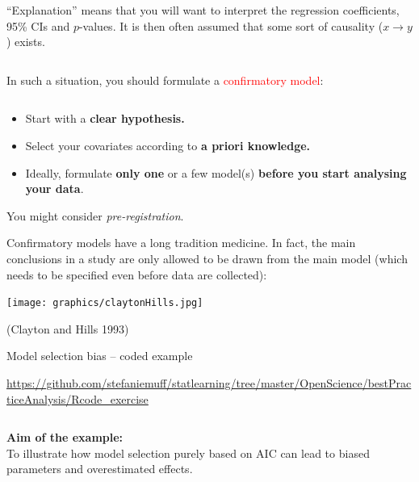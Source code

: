 \documentclass[
  10pt,
  ignorenonframetext,
]{beamer}
\begin{document}
\begin{frame}
\(~\)

``Explanation'' means that you will want to interpret the regression
coefficients, 95\% CIs and \(p\)-values. It is then often assumed that
some sort of causality (\(x\rightarrow y\)) exists.

\(~\)

In such a situation, you should formulate a
\textcolor{red}{confirmatory model}:

\(~\)

\begin{tcolorbox}
\begin{itemize}
\item Start with a {\bf clear hypothesis.}

\vspace{2mm}

\item Select your covariates according to {\bf a priori knowledge.}

\vspace{2mm}

\item Ideally, formulate {\bf only one} or a few model(s) {\bf before you start analysing your data}.
\end{itemize}

\end{tcolorbox}

\vspace{8mm}

You might consider \emph{pre-registration}.
\end{frame}

\begin{frame}
Confirmatory models have a long tradition medicine. In fact, the main
conclusions in a study are only allowed to be drawn from the main model
(which needs to be specified even before data are collected):

\vspace{2mm}

\texttt{[image: graphics/claytonHills.jpg]}
\(~\)

\scriptsize (Clayton and Hills 1993)
\end{frame}

\begin{frame}
\begin{block}{Model selection bias -- coded example}
\protect\hypertarget{model-selection-bias-coded-example}{}
\(~\)

\url{https://github.com/stefaniemuff/statlearning/tree/master/OpenScience/bestPracticeAnalysis/Rcode_exercise}

\(~\)

\begin{tcolorbox}
{\bf Aim of the example:} \\
To illustrate how model selection purely based on AIC can lead to biased parameters and overestimated effects.

\end{tcolorbox}
\end{block}
\end{frame}
\end{document}
